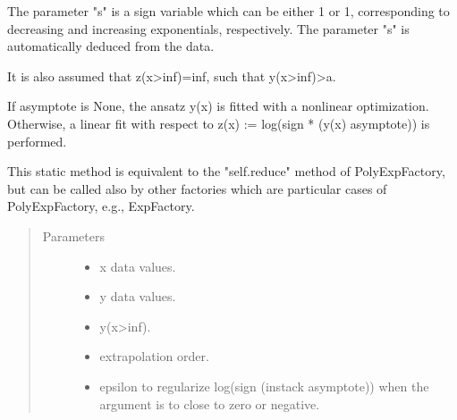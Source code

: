 \documentclass[letterpaper,10pt,english]{sphinxmanual}
\begin{document}
\begin{fulllineitems}
\begin{fulllineitems}
The parameter "s" is a sign variable which can be either 1 or \sphinxhyphen{}1, corresponding to
decreasing and increasing exponentials, respectively. The parameter "s" is
automatically deduced from the data.

It is also assumed that z(x\sphinxhyphen{}\sphinxhyphen{}\textgreater{}inf)=\sphinxhyphen{}inf, such that y(x\sphinxhyphen{}\sphinxhyphen{}\textgreater{}inf)\sphinxhyphen{}\sphinxhyphen{}\textgreater{}a.

If asymptote is None, the ansatz y(x) is fitted with a non\sphinxhyphen{}linear optimization.
Otherwise, a linear fit with respect to z(x) := log(sign * (y(x) \sphinxhyphen{} asymptote))
is performed.

This static method is equivalent to the "self.reduce" method of PolyExpFactory,
but can be called also by other factories which are particular cases of PolyExpFactory,
e.g., ExpFactory.
\begin{quote}\begin{description}
\item[{Parameters}] \leavevmode\begin{itemize}
\item {} 
 \sphinxhyphen{}\sphinxhyphen{} x data values.

\item {} 
 \sphinxhyphen{}\sphinxhyphen{} y data values.

\item {} 
 \sphinxhyphen{}\sphinxhyphen{} y(x\sphinxhyphen{}\textgreater{}inf).

\item {} 
 \sphinxhyphen{}\sphinxhyphen{} extrapolation order.

\item {} 
 \sphinxhyphen{}\sphinxhyphen{} epsilon to regularize log(sign (instack \sphinxhyphen{} asymptote)) when
the argument is to close to zero or negative.

\end{itemize}

\end{description}\end{quote}

\end{fulllineitems}


\end{fulllineitems}
\end{document}
